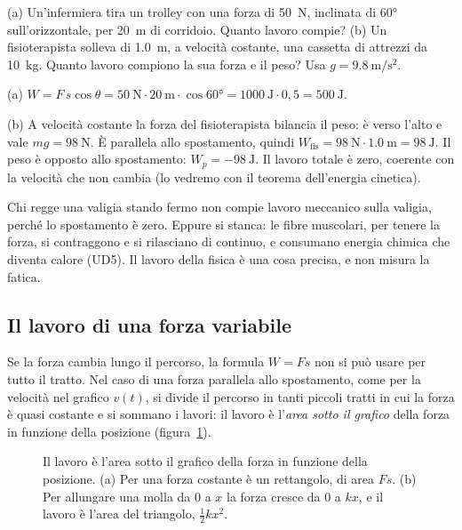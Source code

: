 \begin{esempio}
(a) Un'infermiera tira un trolley con una forza di \SI{50}{\newton}, inclinata di \ang{60} sull'orizzontale, per \SI{20}{\metre} di corridoio. Quanto lavoro compie? (b) Un fisioterapista solleva di \SI{1,0}{\metre}, a velocità costante, una cassetta di attrezzi da \SI{10}{\kilo\gram}. Quanto lavoro compiono la sua forza e il peso? Usa $g = \SI{9,8}{\metre\per\second\squared}$.

(a) $W = F\,s\cos\theta = \SI{50}{\newton} \cdot \SI{20}{\metre} \cdot \cos\ang{60} = \SI{1000}{\joule} \cdot 0{,}5 = \SI{500}{\joule}$.

(b) A velocità costante la forza del fisioterapista bilancia il peso: è verso l'alto e vale $mg = \SI{98}{\newton}$. È parallela allo spostamento, quindi $W_{\text{fis}} = \SI{98}{\newton} \cdot \SI{1,0}{\metre} = \SI{98}{\joule}$. Il peso è opposto allo spostamento: $W_p = -\SI{98}{\joule}$. Il lavoro totale è zero, coerente con la velocità che non cambia (lo vedremo con il teorema dell'energia cinetica).
\end{esempio}

\begin{attenzione}
Chi regge una valigia stando fermo non compie lavoro meccanico sulla valigia, perché lo spostamento è zero. Eppure si stanca: le fibre muscolari, per tenere la forza, si contraggono e si rilasciano di continuo, e consumano energia chimica che diventa calore (UD5). Il lavoro della fisica è una cosa precisa, e non misura la fatica.
\end{attenzione}

\subsection{Il lavoro di una forza variabile}

Se la forza cambia lungo il percorso, la formula $W = Fs$ non si può usare per tutto il tratto. Nel caso di una forza parallela allo spostamento, come per la velocità nel grafico $v(t)$, si divide il percorso in tanti piccoli tratti in cui la forza è quasi costante e si sommano i lavori: il lavoro è l'\emph{area sotto il grafico} della forza in funzione della posizione (figura~\ref{fig:ud2-lavoro}).

\begin{figure}[h]
\centering

\caption{Il lavoro è l'area sotto il grafico della forza in funzione della posizione. (a) Per una forza costante è un rettangolo, di area $Fs$. (b) Per allungare una molla da 0 a $x$ la forza cresce da 0 a $kx$, e il lavoro è l'area del triangolo, $\frac12 kx^2$.}
\label{fig:ud2-lavoro}
\end{figure}

